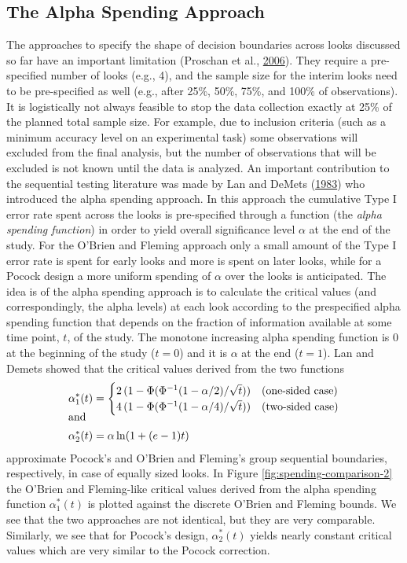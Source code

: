 \documentclass[
  english,
  ,jou, a4paper,floatsintext]{apa6}
\begin{document}
\hypertarget{the-alpha-spending-approach}{%
\subsection{The Alpha Spending Approach}\label{the-alpha-spending-approach}}

The approaches to specify the shape of decision boundaries across looks discussed so far have an important limitation (Proschan et al., \protect\hyperlink{ref-proschan_statistical_2006}{2006}). They require a pre-specified number of looks (e.g., 4), and the sample size for the interim looks need to be pre-specified as well (e.g., after 25\%, 50\%, 75\%, and 100\% of observations). It is logistically not always feasible to stop the data collection exactly at 25\% of the planned total sample size. For example, due to inclusion criteria (such as a minimum accuracy level on an experimental task) some observations will excluded from the final analysis, but the number of observations that will be excluded is not known until the data is analyzed. An important contribution to the sequential testing literature was made by Lan and DeMets (\protect\hyperlink{ref-lan_discrete_1983}{1983}) who introduced the alpha spending approach. In this approach the cumulative Type I error rate spent across the looks is pre-specified through a function (the \emph{alpha spending function}) in order to yield overall significance level \(\alpha\) at the end of the study. For the O'Brien and Fleming approach only a small amount of the Type I error rate is spent for early looks and more is spent on later looks, while for a Pocock design a more uniform spending of \(\alpha\) over the looks is anticipated. The idea is of the alpha spending approach is to calculate the critical values (and correspondingly, the alpha levels) at each look according to the prespecified alpha spending function that depends on the fraction of information available at some time point, \(t\), of the study. The monotone increasing alpha spending function is 0 at the beginning of the study (\(t=0\)) and it is \(\alpha\) at the end (\(t=1\)). Lan and Demets showed that the critical values derived from the two functions
\begin{align*}
\alpha_1^*(t)&=
 \begin{cases}
 2\,(1-\Phi(\Phi^{-1}(1-\alpha/2)/\sqrt{t})) &\hbox{(one-sided case)}\\%
 4\,(1-\Phi(\Phi^{-1}(1-\alpha/4)/\sqrt{t})) &\hbox{(two-sided case)}%
\end{cases}\\[-3mm]
 \intertext{and}
 \alpha_2^*(t)&=\alpha \ln(1+(e-1) t)
\end{align*}
approximate Pocock's and O'Brien and Fleming's group sequential boundaries, respectively, in case of equally sized looks. In Figure \ref{fig:spending-comparison-2} the O'Brien and Fleming-like critical values derived from the alpha spending function \(\alpha_1^*(t)\) is plotted against the discrete O'Brien and Fleming bounds. We see that the two approaches are not identical, but they are very comparable. Similarly, we see that for Pocock's design, \(\alpha_2^*(t)\) yields nearly constant critical values which are very similar to the Pocock correction.
\end{document}
